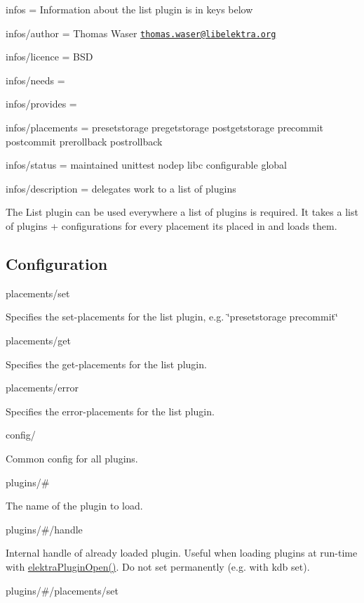 
\begin{DoxyItemize}
\item infos = Information about the list plugin is in keys below
\item infos/author = Thomas Waser \href{mailto:thomas.waser@libelektra.org}{\tt thomas.\+waser@libelektra.\+org}
\item infos/licence = B\+SD
\item infos/needs =
\item infos/provides =
\item infos/placements = presetstorage pregetstorage postgetstorage precommit postcommit prerollback postrollback
\item infos/status = maintained unittest nodep libc configurable global
\item infos/description = delegates work to a list of plugins
\end{DoxyItemize}

The List plugin can be used everywhere a list of plugins is required. It takes a list of plugins + configurations for every placement it\textquotesingle{}s placed in and loads them.

\subsection*{Configuration}

{\ttfamily placements/set}

Specifies the set-\/placements for the list plugin, e.\+g. \char`\"{}presetstorage precommit\char`\"{}

{\ttfamily placements/get}

Specifies the get-\/placements for the list plugin.

{\ttfamily placements/error}

Specifies the error-\/placements for the list plugin.

{\ttfamily config/}

Common config for all plugins.

{\ttfamily plugins/\#}

The name of the plugin to load.

{\ttfamily plugins/\#/handle}

Internal handle of already loaded plugin. Useful when loading plugins at run-\/time with {\ttfamily \hyperlink{elektra_2plugin_8c_a32a70a7876542c51d153164ac5108a57}{elektra\+Plugin\+Open()}}. Do not set permanently (e.\+g. with {\ttfamily kdb set}).

{\ttfamily plugins/\#/placements/set}

